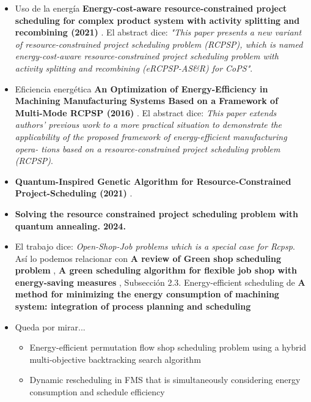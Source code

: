 \begin{itemize}
    \item Uso de la energía \textbf{Energy-cost-aware resource-constrained project scheduling for complex product system with activity splitting and recombining (2021)} \cite{du2021energy}. El abstract dice: \textit{"This paper presents a new variant of resource-constrained project scheduling problem (RCPSP), which is named energy-cost-aware resource-constrained project scheduling problem with activity splitting and recombining (eRCPSP-AS\&R) for CoPS"}.
    
    \item Eficiencia energética \textbf{An Optimization of Energy-Efficiency in Machining Manufacturing Systems Based on a Framework of Multi-Mode RCPSP (2016)} \cite{samukawa2016optimization}. El abstract dice: \textit{This paper extends authors’ previous work to a more practical situation to demonstrate the applicability of the proposed framework of energy-efficient manufacturing opera- tions based on a resource-constrained project scheduling problem (RCPSP)}.
    

    \item \textbf{Quantum-Inspired Genetic Algorithm for Resource-Constrained Project-Scheduling (2021)} \cite{saad2021quantum}.

    \item \textbf{Solving the resource constrained project scheduling problem with quantum annealing. 2024.} \cite{perez2024solving}

\item El trabajo \cite{schutt2009cumulative} dice: \textit{Open-Shop-Job problems which is a special case for Rcpsp}. Así lo podemos relacionar con
\textbf{A review of Green shop scheduling problem}  \cite{li2022review},
\textbf{A green scheduling algorithm for flexible job shop with energy-saving measures}
\cite{wu2018green},
Subsección 2.3. Energy-efficient scheduling de \textbf{A method for minimizing the energy consumption of machining system: integration of process planning and scheduling} \cite{zhang2016method}

\item Queda por mirar...

\begin{itemize}
    \item Energy-efficient permutation flow shop scheduling problem using a hybrid multi-objective backtracking search algorithm

    \item Dynamic rescheduling in FMS that is simultaneously considering energy consumption and schedule efficiency
\end{itemize}

\end{itemize}


